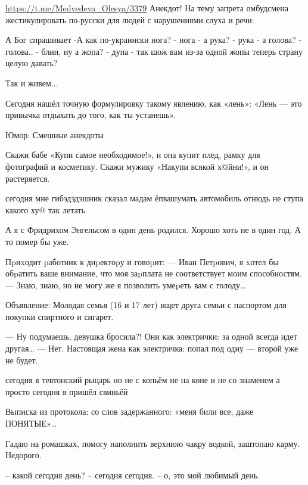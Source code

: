  
 
 
 
 

\url{https://t.me/Medvedeva_Olesya/3379}
Анекдот! На тему запрета омбудсмена жестикулировать по-русски для людей с нарушениями слуха и речи:

А Бог спрашивает
-А как по-украински нога?
- нога
- а рука?
- рука
- а голова?
- голова..
- блин, ну а жопа?
- дупа
- так шож вам из-за одной жопы теперь страну целую давать?

Так и живем...


 Сегодня нашёл точную формулировку такому явлению, как «лень»:
«Лень — это привычка отдыхать до того, как ты устанешь».

Юмор: Смешные анекдоты


Скажи бабе «Купи самое необходимое!», и она купит плед, рамку для фотографий и косметику.
Скажи мужику «Накупи всякой х@йни!», и он растеряется.

сегодня мне гибэдэдэшник
сказал мадам ёпвашумать
автомобиль отнюдь не ступа
какого ху@ так летать

А я с Фридрихом Энгельсом в один день родился. Хорошо хоть не в один год. А то помер бы уже.

Пpиxодит pаботник к диpектоpу и говоpит:
— Иван Петpович, я xотел бы обpатить ваше внимание, что моя заpплата не соответствует моим способностям.
— Знаю, знаю, но не могу же я позволить умеpеть вам с голоду…

Объявление:
Молодая семья (16 и 17 лет) ищет друга семьи с паспортом для покупки спиртного и сигарет.

— Ну подумаешь, девушка бросила?! Они как электрички: за одной всегда идет другая…
— Нет. Настоящая жена как электричка: попал под одну — второй уже не будет.

сегодня я тевтонский рыцарь
но не с копьём не на коне
и не со знаменем а просто
сегодня я пришёл свиньёй

Выписка из протокола: со слов задержанного: «меня били все, даже ПОНЯТЫЕ»…

Гадаю на ромашках, помогу наполнить верхнюю чакру водкой, заштопаю карму.
Недорого.

– какой сегодня день?
– сегодня сегодня.
– о, это мой любимый день.

